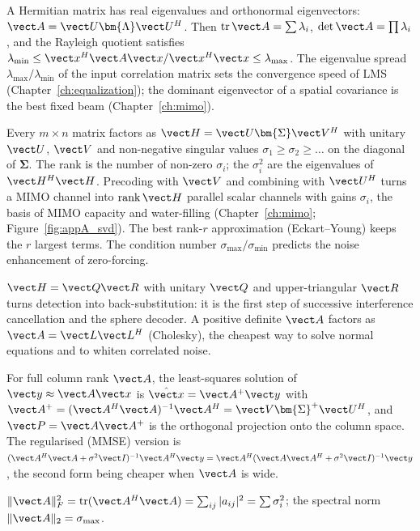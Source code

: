 \begin{description}[leftmargin=1.2em,itemsep=3pt,font=\normalfont\itshape]
\item[Eigendecomposition.] A Hermitian matrix has real eigenvalues and orthonormal eigenvectors:
$\vect A=\vect U\bm{\Lambda}\vect U^H$. Then $\operatorname{tr}\vect A=\sum\lambda_i$,
$\det\vect A=\prod\lambda_i$, and the Rayleigh quotient satisfies
$\lambda_{\min}\le\vect x^H\vect A\vect x/\vect x^H\vect x\le\lambda_{\max}$. The eigenvalue spread
$\lambda_{\max}/\lambda_{\min}$ of the input correlation matrix sets the convergence speed of LMS
(Chapter~\ref{ch:equalization}); the dominant eigenvector of a spatial covariance is the
best fixed beam (Chapter~\ref{ch:mimo}).
\item[Singular value decomposition.] Every $m\times n$ matrix factors as
$\vect H=\vect U\bm{\Sigma}\vect V^H$ with unitary $\vect U$, $\vect V$ and non-negative singular
values $\sigma_1\ge\sigma_2\ge\dots$ on the diagonal of $\bm{\Sigma}$. The rank is the number of
non-zero $\sigma_i$; the $\sigma_i^2$ are the eigenvalues of $\vect H^H\vect H$. Precoding with
$\vect V$ and combining with $\vect U^H$ turns a MIMO channel into $\operatorname{rank}\vect H$
parallel scalar channels with gains $\sigma_i$, the basis of MIMO capacity and water-filling
(Chapter~\ref{ch:mimo}; Figure~\ref{fig:appA_svd}). The best rank-$r$ approximation
(Eckart--Young) keeps the $r$ largest terms. The condition number $\sigma_{\max}/\sigma_{\min}$
predicts the noise enhancement of zero-forcing.
\item[QR and Cholesky.] $\vect H=\vect Q\vect R$ with unitary $\vect Q$ and upper-triangular
$\vect R$ turns detection into back-substitution: it is the first step of successive
interference cancellation and the sphere decoder. A positive definite $\vect A$ factors as
$\vect A=\vect L\vect L^H$ (Cholesky), the cheapest way to solve normal equations and to whiten
correlated noise.
\item[Pseudo-inverse and least squares.] For full column rank $\vect A$, the least-squares
solution of $\vect y\approx\vect A\vect x$ is $\hat{\vect x}=\vect A^+\vect y$ with
$\vect A^+=(\vect A^H\vect A)^{-1}\vect A^H=\vect V\bm{\Sigma}^+\vect U^H$, and
$\vect P=\vect A\vect A^+$ is the orthogonal projection onto the column space. The regularised
(MMSE) version is $(\vect A^H\vect A+\sigma^2\vect I)^{-1}\vect A^H\vect y
=\vect A^H(\vect A\vect A^H+\sigma^2\vect I)^{-1}\vect y$, the second form being cheaper when $\vect A$
is wide.
\item[Norms.] $\|\vect A\|_F^2=\operatorname{tr}(\vect A^H\vect A)=\sum_{ij}|a_{ij}|^2=\sum\sigma_i^2$;
the spectral norm $\|\vect A\|_2=\sigma_{\max}$.
\end{description}

